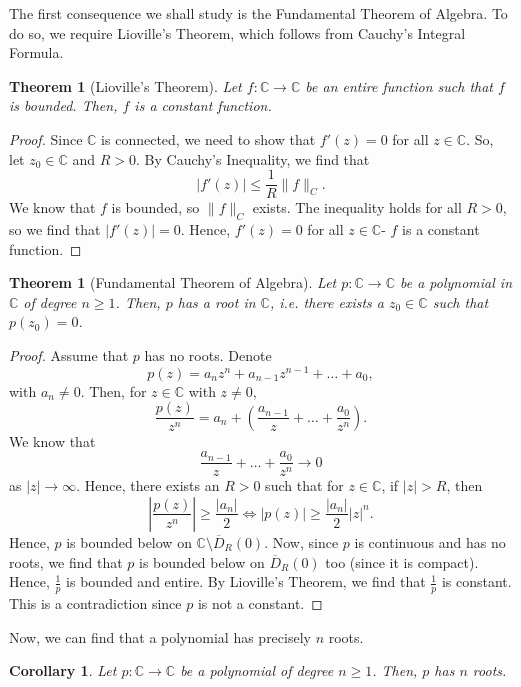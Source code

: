 \documentclass[a4paper, openany]{memoir}
\theoremstyle{definition}
\theoremstyle{plain}
\newtheorem{theorem}[definition]{Theorem}
\newtheorem{corollary}[definition]{Corollary}
\begin{document}
    The first consequence we shall study is the Fundamental Theorem of Algebra. To do so, we require Lioville's Theorem, which follows from Cauchy's Integral Formula.
    \begin{theorem}[Lioville's Theorem]
        Let $f \colon \mathbb{C} \to \mathbb{C}$ be an entire function such that $f$ is bounded. Then, $f$ is a constant function.
    \end{theorem}
    \begin{proof}
        Since $\mathbb{C}$ is connected, we need to show that $f'(z) = 0$ for all $z \in \mathbb{C}$. So, let $z_0 \in \mathbb{C}$ and $R > 0$. By Cauchy's Inequality, we find that
        \[|f'(z)| \leq \frac{1}{R} \lVert f \rVert_C.\]
        We know that $f$ is bounded, so $\lVert f \rVert_C$ exists. The inequality holds for all $R > 0$, so we find that $|f'(z)| = 0$. Hence, $f'(z) = 0$ for all $z \in \mathbb{C}$- $f$ is a constant function.
    \end{proof}
    \begin{theorem}[Fundamental Theorem of Algebra]
        Let $p \colon \mathbb{C} \to \mathbb{C}$ be a polynomial in $\mathbb{C}$ of degree $n \geq 1$. Then, $p$ has a root in $\mathbb{C}$, i.e. there exists a $z_0 \in \mathbb{C}$ such that $p(z_0) = 0$.
    \end{theorem}
    \begin{proof}
        Assume that $p$ has no roots. Denote
        \[p(z) = a_n z^n + a_{n-1} z^{n-1} + \dots + a_0,\]
        with $a_n \neq 0$. Then, for $z \in \mathbb{C}$ with $z \neq 0$,
        \[\frac{p(z)}{z^n} = a_n + \left(\frac{a_{n-1}}{z} + \dots + \frac{a_0}{z^n}\right).\]
        We know that 
        \[\frac{a_{n-1}}{z} + \dots + \frac{a_0}{z^n} \to 0\]
        as $|z| \to \infty$. Hence, there exists an $R > 0$ such that for $z \in \mathbb{C}$, if $|z| > R$, then 
        \[\left|\frac{p(z)}{z^n}\right| \geq \frac{|a_n|}{2} \iff |p(z)| \geq \frac{|a_n|}{2} |z|^n.\]
        Hence, $p$ is bounded below on $\mathbb{C} \setminus \overline{D}_R(0)$. Now, since $p$ is continuous and has no roots, we find that $p$ is bounded below on $\overline{D}_R(0)$ too (since it is compact). Hence, $\frac{1}{p}$ is bounded and entire. By Lioville's Theorem, we find that $\frac{1}{p}$ is constant. This is a contradiction since $p$ is not a constant.
    \end{proof}
    Now, we can find that a polynomial has precisely $n$ roots.
    \begin{corollary}
        Let $p \colon \mathbb{C} \to \mathbb{C}$ be a polynomial of degree $n \geq 1$. Then, $p$ has $n$ roots.
    \end{corollary}
\end{document}
